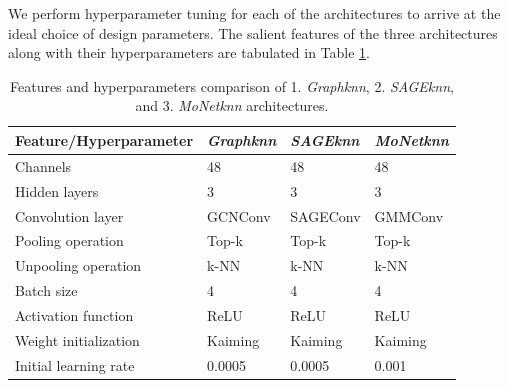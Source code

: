 We perform hyperparameter tuning for each of the architectures to arrive at the ideal choice of design parameters. The salient features of the three architectures along with their hyperparameters are tabulated in Table \ref{prophp}. 
\begin{table}[ht]
    \centering
    \caption{Features and hyperparameters comparison of 1. \textit{Graphknn}, 2. \textit{SAGEknn}, and 3. \textit{MoNetknn} architectures.}
    \label{prophp}
    \begin{tabular}{|l|l|l|l|}
    \hline
    \textbf{Feature/Hyperparameter}    & \textit{Graphknn} & \textit{SAGEknn}   & \textit{MoNetknn} \\
    \hline
    Channels    & 48 & 48 & 48                           \\
    \hline
    Hidden layers    & 3 & 3 & 3                          \\
    \hline
    Convolution layer             &     GCNConv & SAGEConv & GMMConv                   \\
    \hline
    Pooling operation             &    Top-k &  Top-k &  Top-k                     \\
    \hline
    Unpooling operation         &   k-NN&   k-NN &   k-NN               \\
    \hline
    Batch size                 & 4 & 4& 4                         \\
    \hline
    Activation function        & ReLU  & ReLU  & ReLU                       \\
    \hline
    Weight initialization    &  Kaiming &  Kaiming &  Kaiming                        \\
    \hline
    Initial learning rate       & 0.0005 & 0.0005 & 0.001                        \\
    \hline
    \end{tabular}
    \end{table}
